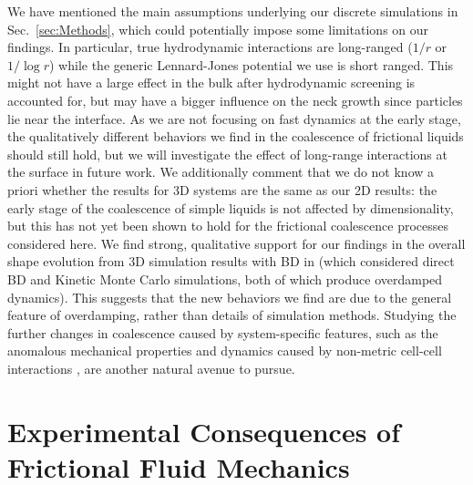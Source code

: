 \documentclass[%
reprint,
amsmath,amssymb,
aps,
]{revtex4-2}
\begin{document}
	We have mentioned the main assumptions underlying our discrete simulations in Sec.~\ref{sec:Methods}, which could potentially impose some limitations on our findings. In particular, true hydrodynamic interactions are long-ranged ($1/r$ or $1/\log{r}$) while the generic Lennard-Jones potential we use is short ranged. This might not have a large effect in the bulk after hydrodynamic screening is accounted for, but may have a bigger influence on the neck growth since particles lie near the interface. As we are not focusing on fast dynamics at the early stage, the qualitatively different behaviors we find in the coalescence of frictional liquids should still hold, but we will investigate the effect of long-range interactions at the surface in future work. We additionally comment that we do not know a priori whether the results for 3D systems are the same as our 2D results: the early stage of the coalescence of simple liquids is not affected by dimensionality, but this has not yet been shown to hold for the frictional coalescence processes considered here. We find strong, qualitative support for our findings in the overall shape evolution from 3D simulation results with BD in \cite{flennerKineticMonteCarlo2012} (which considered direct BD and Kinetic Monte Carlo simulations, both of which produce overdamped dynamics). This suggests that the new behaviors we find are due to the general feature of overdamping, rather than details of simulation methods. Studying the further changes in coalescence caused by system-specific features, such as the anomalous mechanical properties and dynamics caused by non-metric cell-cell interactions \cite{sussman2018soft, sussman2018anomalous}, are another natural avenue to pursue.
	
	\section{Experimental Consequences of Frictional Fluid Mechanics} 
	\label{sec:significance}
 
\end{document}
